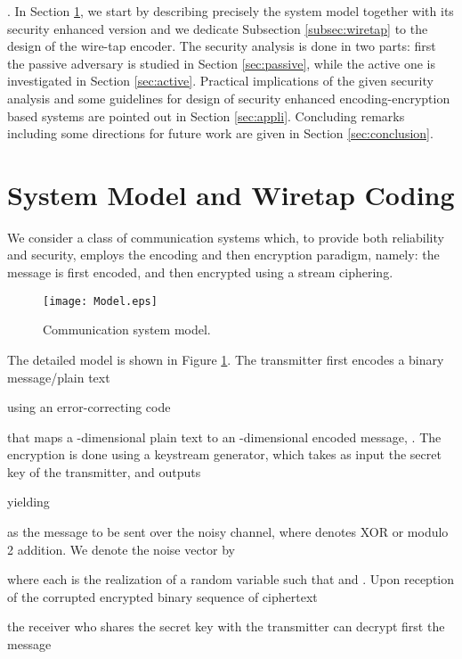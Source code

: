 \documentclass{article}[11pt]
\begin{document}
\vspace*{0.25cm} . In
Section \ref{sec:model}, we start by describing precisely the
system model together with its security enhanced version and we
dedicate Subsection \ref{subsec:wiretap} to the design of the
wire-tap encoder. The security analysis is done in two parts:
first the passive adversary is studied in Section
\ref{sec:passive}, while the  active one is investigated in
Section \ref{sec:active}. Practical implications of the given
security analysis and some guidelines for design of security
enhanced encoding-encryption based systems are pointed out in
Section \ref{sec:appli}. Concluding remarks including some
directions for future work are given in Section
\ref{sec:conclusion}.



\section{System Model and Wiretap Coding}
\label{sec:model}

We consider a class of communication systems which, to provide
both reliability and security, employs the encoding and then encryption
paradigm, namely: the message is first encoded, and then encrypted
using a stream ciphering.

\begin{figure}[htb]
\leavevmode
\begin{center}
\texttt{[image: Model.eps]}
\caption{Communication system model.}
\label{fig:figure-1}
\end{center}
\end{figure}
The detailed model is shown in Figure \ref{fig:figure-1}.
The transmitter first encodes a binary message/plain text

using an error-correcting code 

that maps a -dimensional plain text to an -dimensional
encoded message, .
The encryption is done using a keystream generator, which takes
as input the secret key  of the transmitter, and outputs

yielding

as the message to be sent over the noisy channel, where
 denotes XOR or modulo 2 addition. We denote the noise
vector by

where each  is the realization of a random variable 
such that  and .
Upon reception of the corrupted encrypted binary sequence of ciphertext

the receiver who shares the secret key  with the transmitter can decrypt
first the message
\end{document}
